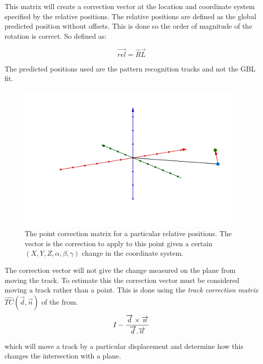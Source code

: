 This matrix will create a correction vector at the location and coordinate system specified by the relative positions. 
The relative positions are defined as the global predicted position without offsets. This is done so the order of magnitude of the rotation is correct. So defined as:

\begin{equation}
 \overrightarrow{rel} =   \hat{R}\overrightarrow{L} 
\end{equation}

The predicted positions used are the pattern recognition tracks and not the GBL fit.  

\begin{figure}[H]
\centering
\includegraphics[width=1.0\linewidth]{figures/corrAlign.png}
\caption{The point correction matrix for a particular relative positions. The vector is the correction to apply to this point given a certain $(X,Y,Z, \alpha,\beta,\gamma)$ change in the coordinate system.}
\label{fig:CorrMatrix}
\end{figure}

The correction vector will not give the change measured on the plane from moving the track. To estimate this the correction vector must be considered moving a track rather than a point. This is done using the \emph{track correction matrix} $\hat{TC}(\overrightarrow d, \overrightarrow n )$ of the from.
\begin{equation}
  I -  \frac{\overrightarrow d \times \overrightarrow n}{\overrightarrow d . \overrightarrow n}\\
  \label{eq:TC}
\end{equation}

which will move a track by a particular displacement and determine how this changes the intersection with a plane. 

